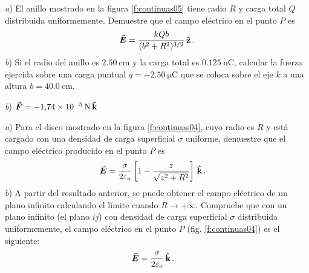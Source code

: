 %
\begin{Exercise}\label{p:continuas05}
  \textit{a}) \textbf{} El anillo mostrado en la figura \ref{f:continuas05} tiene radio $R$ y carga total $Q$ distribuida uniformemente. Demuestre que el campo eléctrico en el punto $P$ es
  \begin{align*}
    \va*{E} = \frac{kQb}{(b^2+R^2)^{3/2}} \,\vu{z}\, .
  \end{align*}
  \textit{b}) Si el radio del anillo es $\SI{2.50}{\centi\metre}$ y la carga total es $\SI{0.125}{\nano\coulomb}$, calcular la fuerza ejercida sobre una carga puntual $q = \SI{-2.50}{\micro\coulomb}$ que se coloca sobre el eje $k$ a una altura $b = \SI{40.0}{\centi\metre}$.
\end{Exercise}
\begin{Answer}
  \textit{b}) $\va*{F} = \SI{-1.74E-5}{\newton}\,\vu{k}$
\end{Answer}
%
\begin{center}
\end{center}
%
\begin{Exercise}\label{p:continuas04}
  \textbf{} \textit{a}) Para el disco mostrado en la figura \ref{f:continuas04}, cuyo radio es $R$ y está cargado con una densidad de carga superficial $\sigma$ uniforme, demuestre que el campo eléctrico producido en el punto $P$ es
  \begin{align*}
    \va*{E} &= \frac{\sigma}{2\varepsilon_o} \left [ 1 - \frac{z}{\sqrt{z^2+R^2}} \right ] \,\vu{k}\,.
  \end{align*}
  \textit{b}) A partir del resultado anterior, se puede obtener el campo eléctrico de un plano infinito calculando el límite cuando $R \to +\infty$. Compruebe que con un plano infinito (el plano $ij$) con densidad de carga superficial $\sigma$ distribuida uniformemente, el campo eléctrico en el punto $P$ (fig. \ref{f:continuas04}) es el siguiente:
  \begin{align*}
    \va*{E} &= \frac{\sigma}{2\varepsilon_o}\,\vu{k}\,.
  \end{align*}
\end{Exercise}
